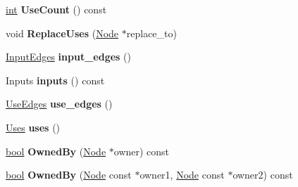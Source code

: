 \begin{DoxyCompactItemize}
\mbox{\hyperlink{classint}{int}} {\bfseries Use\+Count} () const
\item 
\mbox{\label{classv8_1_1internal_1_1compiler_1_1Node_ae2451c0f21e2ad42659a5e683703a586}} 
void {\bfseries Replace\+Uses} (\mbox{\hyperlink{classv8_1_1internal_1_1compiler_1_1Node}{Node}} $\ast$replace\+\_\+to)
\item 
\mbox{\label{classv8_1_1internal_1_1compiler_1_1Node_a245c804920ad53587faa4d229b255bfd}} 
\mbox{\hyperlink{classv8_1_1internal_1_1compiler_1_1Node_1_1InputEdges}{Input\+Edges}} {\bfseries input\+\_\+edges} ()
\item 
\mbox{\label{classv8_1_1internal_1_1compiler_1_1Node_a5fd30f94dda21206092c9021e826e52a}} 
Inputs {\bfseries inputs} () const
\item 
\mbox{\label{classv8_1_1internal_1_1compiler_1_1Node_a8e6ac5b4db259febd1b67e64768b1443}} 
\mbox{\hyperlink{classv8_1_1internal_1_1compiler_1_1Node_1_1UseEdges}{Use\+Edges}} {\bfseries use\+\_\+edges} ()
\item 
\mbox{\label{classv8_1_1internal_1_1compiler_1_1Node_a9ebd76ae3786acc626d9c4f3cc3f8557}} 
\mbox{\hyperlink{classv8_1_1internal_1_1compiler_1_1Node_1_1Uses}{Uses}} {\bfseries uses} ()
\item 
\mbox{\label{classv8_1_1internal_1_1compiler_1_1Node_a045a20cdd5b6375940f2f17c0be87dc7}} 
\mbox{\hyperlink{classbool}{bool}} {\bfseries Owned\+By} (\mbox{\hyperlink{classv8_1_1internal_1_1compiler_1_1Node}{Node}} $\ast$owner) const
\item 
\mbox{\label{classv8_1_1internal_1_1compiler_1_1Node_a4d0ca7244ef6465a54cefe34009f50c9}} 
\mbox{\hyperlink{classbool}{bool}} {\bfseries Owned\+By} (\mbox{\hyperlink{classv8_1_1internal_1_1compiler_1_1Node}{Node}} const $\ast$owner1, \mbox{\hyperlink{classv8_1_1internal_1_1compiler_1_1Node}{Node}} const $\ast$owner2) const
\item 
\mbox{\label{classv8_1_1internal_1_1compiler_1_1Node_a88d1dbaf4de823f1911b4bd831cd4226}} 

\end{DoxyCompactItemize}
